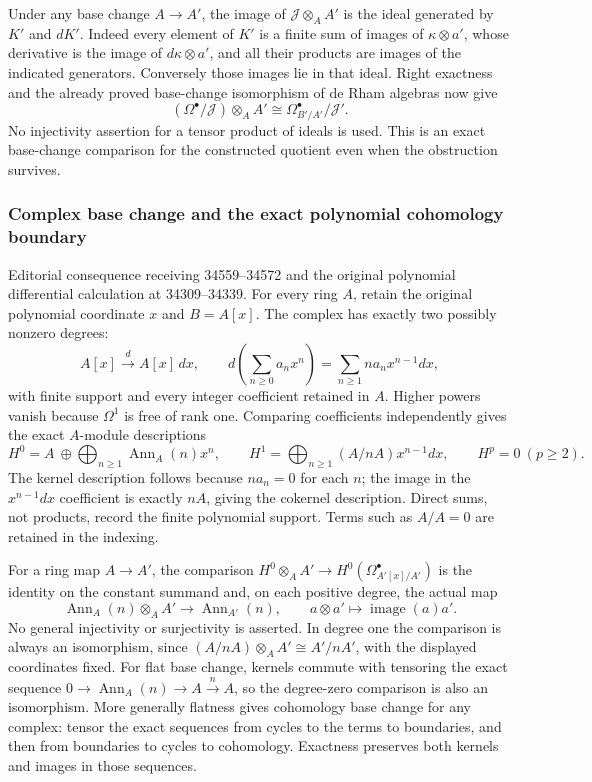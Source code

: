 Under any base change \(A\to A'\), the image of \(\mathcal J\otimes_A A'\) is the ideal generated by \(K'\) and \(dK'\). Indeed every element of \(K'\) is a finite sum of images of \(\kappa\otimes a'\), whose derivative is the image of \(d\kappa\otimes a'\), and all their products are images of the indicated generators. Conversely those images lie in that ideal. Right exactness and the already proved base-change isomorphism of de Rham algebras now give \[
(\Omega^\bullet/\mathcal J)\otimes_A A'
\cong \Omega_{B'/A'}^\bullet/\mathcal J'.
\] No injectivity assertion for a tensor product of ideals is used. This is an exact base-change comparison for the constructed quotient even when the obstruction survives.

\subsubsection{Complex base change and the exact polynomial cohomology boundary}\label{algebra-proof-042-complex-base-change-and-the-exact-polynomial-cohomology-boundary}

Editorial consequence receiving 34559--34572 and the original polynomial differential calculation at 34309--34339. For every ring \(A\), retain the original polynomial coordinate \(x\) and \(B=A[x]\). The complex has exactly two possibly nonzero degrees: \[
A[x]\xrightarrow d A[x]\,dx,
\qquad d\left(\sum_{n\ge0}a_nx^n\right)=\sum_{n\ge1}n a_n x^{n-1}dx,
\] with finite support and every integer coefficient retained in \(A\). Higher powers vanish because \(\Omega^1\) is free of rank one. Comparing coefficients independently gives the exact \(A\)-module descriptions \[
H^0=A\ \oplus\!\bigoplus_{n\ge1}\operatorname{Ann}_A(n)x^n,
\qquad
H^1=\bigoplus_{n\ge1}(A/nA)x^{n-1}dx,
\qquad H^p=0\ (p\ge2).
\] The kernel description follows because \(n a_n=0\) for each \(n\); the image in the \(x^{n-1}dx\) coefficient is exactly \(nA\), giving the cokernel description. Direct sums, not products, record the finite polynomial support. Terms such as \(A/A=0\) are retained in the indexing.

For a ring map \(A\to A'\), the comparison \(H^0\otimes_A A'\to H^0(\Omega_{A'[x]/A'}^\bullet)\) is the identity on the constant summand and, on each positive degree, the actual map \[
\operatorname{Ann}_A(n)\otimes_A A'\longrightarrow\operatorname{Ann}_{A'}(n),\qquad a\otimes a'\longmapsto\operatorname{image}(a)a'.
\] No general injectivity or surjectivity is asserted. In degree one the comparison is always an isomorphism, since \((A/nA)\otimes_A A'\cong A'/nA'\), with the displayed coordinates fixed. For flat base change, kernels commute with tensoring the exact sequence \(0\to\operatorname{Ann}_A(n)\to A\xrightarrow n A\), so the degree-zero comparison is also an isomorphism. More generally flatness gives cohomology base change for any complex: tensor the exact sequences from cycles to the terms to boundaries, and then from boundaries to cycles to cohomology. Exactness preserves both kernels and images in those sequences.

